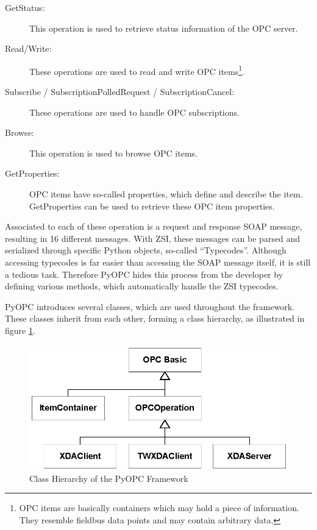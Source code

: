 \begin{description}
\item[GetStatus:] This operation is used to retrieve status information of
the OPC server.
\item[Read/Write:] These operations are used to read and write OPC
items\footnote{OPC items are basically containers which may hold a
piece of information. They resemble fieldbus data points and may
contain arbitrary data.}.
\item[Subscribe / SubscriptionPolledRequest / SubscriptionCancel:]
These operations are used to handle OPC subscriptions.
\item[Browse:] This operation is used to browse OPC items.
\item[GetProperties:] OPC items have so-called properties, which
define and describe the item. GetProperties can be used to retrieve
these OPC item properties.
\end{description}

Associated to each of these operation is a request and response SOAP
message, resulting in 16 different messages. With ZSI, these messages
can be parsed and serialized through specific Python objects,
so-called ``Typecodes''. Although accessing typecodes is far easier
than accessing the SOAP message itself, it is still a tedious
task. Therefore PyOPC hides this process from the developer by
defining various methods, which automatically handle the ZSI
typecodes. 

PyOPC introduces several classes, which are used throughout the
framework. These classes inherit from each other, forming a class
hierarchy, as illustrated in figure \ref{object_hierarchy}.

\begin{figure}[ht]
\centering
\includegraphics[scale=0.7]{graphics/object_hierarchy.eps}
\caption{Class Hierarchy of the PyOPC Framework}
\label {object_hierarchy} 
\end{figure}

